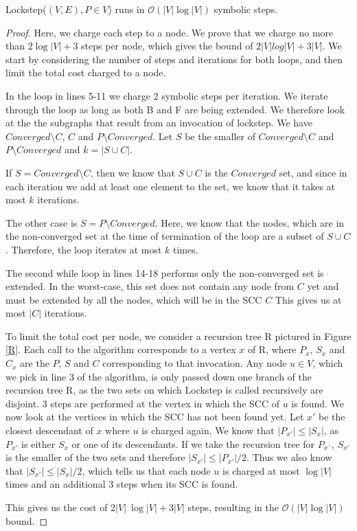 \documentclass[../master/master.tex]{subfiles}
\begin{document}
\begin{theorem}\label{lockstep} Lockstep($(V, E), P\in V$) runs in $\mathcal{O}(|V|\log |V|)$ symbolic steps.
\end{theorem}
\begin{proof}
  Here, we charge each step to a node. We prove that we charge no more than $2 \log |V|+3$ steps per node, which gives the bound of $2|V|log|V|+3|V|$. We start by considering the number of steps and iterations for both loops, and then limit the total cost charged to a node.

  In the loop in lines 5-11 we charge 2 symbolic steps per iteration. We iterate through the loop as long as both B and F are being extended. We therefore look at the the subgraphs that result from an invocation of lockstep. We have $Converged\setminus C$, $C$ and $P\setminus Converged$. Let $S$ be the smaller of $Converged\setminus C$ and $P\setminus Converged$ and $k = |S\cup C|$.

  If $S = Converged\setminus C$, then we know that $S\cup C$ is the $Converged$ set, and since in each iteration we add at least one element to the set, we know that it takes at most $k$ iterations.

  The other case is $S=P\setminus Converged$. Here, we know that the nodes, which are in the non-converged set at the time of termination of the loop are a subset of $S\cup C$. Therefore, the loop iterates at most $k$ times.

  The second while loop in lines 14-18 performs only the non-converged set is extended. In the worst-case, this set does not contain any node from $C$ yet and must be extended by all the nodes, which will be in the SCC $C$ This gives us at most $|C|$ iterations.

  To limit the total cost per node, we consider a recursion tree R pictured in Figure \ref{R}. Each call to the algorithm corresponds to a vertex $x$ of R, where $P_x$, $S_x$ and $C_x$ are the $P$, $S$ and $C$ corresponding to that invocation. Any node $u \in V$, which we pick in line 3 of the algorithm, is only passed down one branch of the recursion tree R, as the two sets on which Lockstep is called recursively are disjoint. 3 steps are performed at the vertex in which the SCC of $u$ is found. We now look at the vertices in which the SCC has not been found yet. Let $x'$ be the closest descendant of $x$ where $u$ is charged again. We know that $|P_{x'}|\leq |S_x|$, as $P_{x'}$ is either $S_x$ or one of its descendants. If we take the recursion tree for $P_{x´}$, $S_{x'}$ is the smaller of the two sets and therefore $|S_{x'}|\leq |P_{x'}|/2$. Thus we also know that $|S_{x'}|\leq |S_{x}|/2$, which tells us that each node $u$ is charged at most $\log |V|$ times and an additional 3 steps when its SCC is found.

  This gives us the cost of $2|V|\ \log |V| + 3|V|$ steps, resulting in the $\mathcal{O}(|V|\log |V|)$ bound.
\end{proof}
\end{document}
